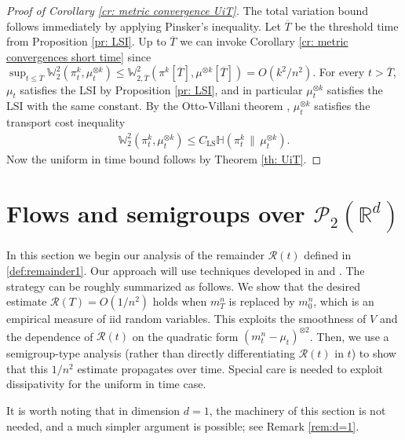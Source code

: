 \documentclass[11pt,reqno]{amsart}
\numberwithin{equation}{section}
\theoremstyle{definition}
\def\R{{\mathbb R}}
\newcommand{\W}{\mathbb W}
\newcommand{\ent}{ \mathbb H}
\begin{document}
\begin{proof}[Proof of Corollary \ref{cr: metric convergence UiT}]
The total variation bound follows immediately by applying Pinsker's inequality. Let $\overline T$ be the threshold time from Proposition \ref{pr: LSI}. Up to $\overline T$ we can invoke Corollary \ref{cr: metric convergences short time} since $\sup_{t\leq \overline T}\W_2^2(\pi^k_t,\mu_t^{\otimes k})\leq \W_{2,\overline T}^2(\pi^k\left[\overline T\right],\mu^{\otimes k}\left[\overline T\right])=O(k^2/n^2)$. For every $t>\overline T$, $\mu_t$ satisfies the LSI by Proposition \ref{pr: LSI}, and in particular $\mu_t^{\otimes k}$ satisfies the LSI with the same constant. By the Otto-Villani theorem \cite{OttoVillaniLSITalagrand}, $\mu_t^{\otimes k}$ satisfies the transport cost inequality
\begin{align*}
    \W_2^2(\pi_t^k,\mu_t^{\otimes k})\leq C_{\text{LS}} \ent(\pi_t^{k}\,\|\,\mu_t^{\otimes k}). 
\end{align*}
Now the uniform in time bound follows by Theorem \ref{th: UiT}.
\end{proof}


\section{Flows and semigroups over $\mathcal P_2(\R^d)$}
\label{sect: weak chaos}

In this section we begin our analysis of the remainder $\mathcal R(t)$ defined in \eqref{def:remainder1}. Our approach will use techniques developed in \cite{Buckdahn2017-op} and \cite{Chassagneux2022-jt}. 
The strategy can be roughly summarized as follows. We show that the desired estimate $\mathcal{R}(T) = O(1/n^2)$ holds when $m^n_T$ is replaced by $m^n_0$, which is an empirical measure of iid random variables. This exploits the smoothness of $V$ and the dependence of $\mathcal R(t)$ on the quadratic form $(m^n_t-\mu_t)^{\otimes 2}$. Then, we use a semigroup-type analysis (rather than directly differentiating $\mathcal R(t)$ in $t$) to show that this $1/n^2$ estimate propagates over time. Special care is needed to exploit dissipativity for the uniform in time case.

It is worth noting that in dimension $d=1$, the machinery of this section is not needed, and a much simpler argument is possible; see Remark \ref{rem:d=1}.
 
\end{document}

